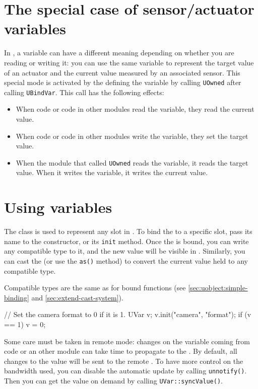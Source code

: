 \section{The special case of sensor/actuator variables}

In \urbi, a variable can have a different meaning depending on whether you
are reading or writing it: you can use the same variable to represent the
target value of an actuator and the current value measured by an associated
sensor. This special mode is activated by the \UObject defining the variable
by calling \lstinline{UOwned} after calling \lstinline{UBindVar}. This call
has the following effects:
\begin{itemize}
\item When \urbi code or code in other modules read the variable, they read
  the current value.
\item When \urbi code or code in other modules write the variable, they set
  the target value.
\item When the module that called \lstinline|UOwned| reads the variable, it
  reads the target value. When it writes the variable, it writes the current
  value.
\end{itemize}

\section{Using \urbi variables}

The \Cxx class \UVar is used to represent any \urbi slot in \Cxx.  To bind
the \UVar to a specific slot, pass its name to the \UVar constructor, or its
\lstinline|init| method.  Once the \UVar is bound, you can write any
compatible type to it, and the new value will be visible in \us.  Similarly,
you can cast the \UVar (or use the \lstinline{as()} method) to convert the
current \us value held to any compatible type.

Compatible types are the same as for bound functions (see \autoref{sec:uobject:simple-binding} and \autoref{sec:extend-cast-system}).

\begin{cxx}
// Set the camera format to 0 if it is 1.
UVar v;
v.init("camera", "format");
if (v == 1)
 v = 0;
\end{cxx}

Some care must be taken in remote mode: changes on the variable coming from
\urbi code or an other module can take time to propagate to the \UVar. By
default, all changes to the value will be sent to the remote \UObject. To
have more control on the bandwidth used, you can disable the automatic
update by calling \lstinline|unnotify()|. Then you can get the value on
demand by calling \lstinline|UVar::syncValue()|.

